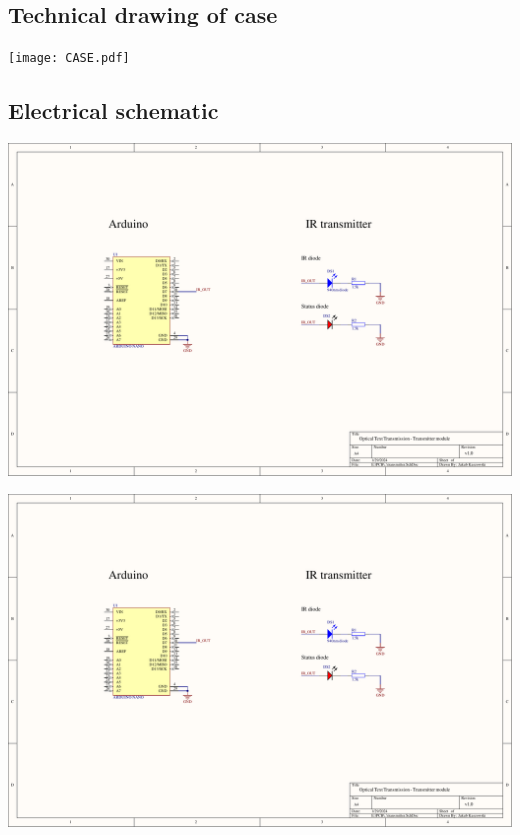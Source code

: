 \documentclass[12pt]{article}
\begin{document}
  \begin{appendices}
  \begin{landscape}
	\section{Technical drawing of case}
    \texttt{[image: CASE.pdf]}
    \thispagestyle{empty}
    \label{appendix:drawing}
  \end{landscape}
  \begin{landscape}

    \section{Electrical schematic}
    \label{appendix:circuit}
    \includegraphics[scale=0.8,page=1]{schematics.pdf}
    \thispagestyle{empty}
    \newpage


    \includegraphics[scale=0.85,page=2]{schematics.pdf}
    \thispagestyle{empty}
  \end{landscape}


\end{appendices}
\end{document}
